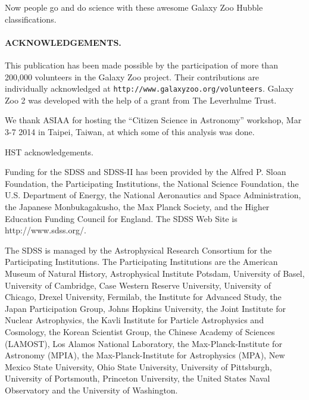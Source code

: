 \documentclass[usenatbib]{mn2e}
\begin{document}
Now people go and do science with these awesome Galaxy Zoo Hubble classifications.  
 
 
\paragraph*{ACKNOWLEDGEMENTS.} 

This publication has been made possible by the participation of more than 200,000 volunteers in the Galaxy Zoo project. Their contributions are individually acknowledged at \texttt{http://www.galaxyzoo.org/volunteers}. Galaxy Zoo 2 was developed with the help of a grant from The Leverhulme Trust. 

We thank ASIAA for hosting the ``Citizen Science in Astronomy'' workshop, Mar 3-7 2014 in Taipei, Taiwan, at which some of this analysis was done. 

HST acknowledgements.

Funding for the SDSS and SDSS-II has been provided by the Alfred P. Sloan Foundation, the Participating Institutions, the National Science Foundation, the U.S. Department of Energy, the National Aeronautics and Space Administration, the Japanese Monbukagakusho, the Max Planck Society, and the Higher Education Funding Council for England. The SDSS Web Site is http://www.sdss.org/. 

The SDSS is managed by the Astrophysical Research Consortium for the Participating Institutions. The Participating Institutions are the American Museum of Natural History, Astrophysical  Institute Potsdam, University of Basel, University of Cambridge, Case Western Reserve University, University of Chicago, Drexel University, Fermilab, the Institute for Advanced Study, the Japan Participation Group, Johns Hopkins University, the Joint Institute for Nuclear Astrophysics, the Kavli Institute for Particle Astrophysics and Cosmology, the Korean Scientist Group, the Chinese Academy of Sciences (LAMOST), Los Alamos National Laboratory, the Max-Planck-Institute for Astronomy (MPIA), the Max-Planck-Institute for Astrophysics (MPA), New Mexico State University, Ohio State University, University of Pittsburgh, University of Portsmouth, Princeton University, the United States Naval Observatory and the University of Washington. 


\end{document}
